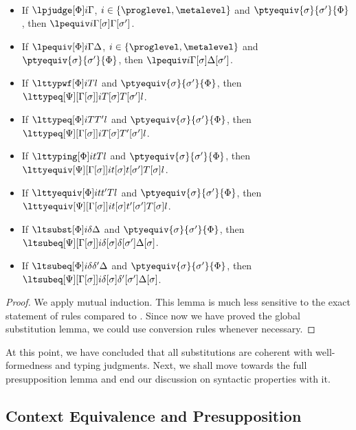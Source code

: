 \begin{lemma}$ $
  \begin{itemize}
  \item If $\lpjudge[\Phi] i \Gamma$, $i \in \{\proglevel, \metalevel\}$ and $\ptyequiv{\sigma}{\sigma'}{\Phi}$, then $\lpequiv i {\Gamma[\sigma]}{\Gamma[\sigma']}$.
  \item If $\lpequiv[\Phi] i \Gamma \Delta$, $i \in \{\proglevel, \metalevel\}$ and $\ptyequiv{\sigma}{\sigma'}{\Phi}$, then $\lpequiv i {\Gamma[\sigma]}{\Delta[\sigma']}$.
  \item If $\lttypwf[\Phi]i T l$ and $\ptyequiv{\sigma}{\sigma'}{\Phi}$, then
    $\lttypeq[\Psi][\Gamma[\sigma]] i{T[\sigma]}{T[\sigma']} l$.
  \item If $\lttypeq[\Phi]i T{T'} l$ and $\ptyequiv{\sigma}{\sigma'}{\Phi}$, then
    $\lttypeq[\Psi][\Gamma[\sigma]] i{T[\sigma]}{T'[\sigma']} l$.
  \item If $\lttyping[\Phi]i t T l$ and $\ptyequiv{\sigma}{\sigma'}{\Phi}$, then
    $\lttyequiv[\Psi][\Gamma[\sigma]] i{t[\sigma]}{t[\sigma']}{T[\sigma]} l$.
  \item If $\lttyequiv[\Phi]i t{t'} T l$ and $\ptyequiv{\sigma}{\sigma'}{\Phi}$, then
    $\lttyequiv[\Psi][\Gamma[\sigma]] i{t[\sigma]}{t'[\sigma']}{T[\sigma]} l$.
  \item If $\ltsubst[\Phi] i{\delta}{\Delta}$ and $\ptyequiv{\sigma}{\sigma'}{\Phi}$, then
    $\ltsubeq[\Psi][\Gamma[\sigma]] i{\delta[\sigma]}{\delta[\sigma']}{\Delta[\sigma]}$.
  \item If $\ltsubeq[\Phi] i{\delta}{\delta'}{\Delta}$ and $\ptyequiv{\sigma}{\sigma'}{\Phi}$, then
    $\ltsubeq[\Psi][\Gamma[\sigma]] i{\delta[\sigma]}{\delta'[\sigma']}{\Delta[\sigma]}$.
  \end{itemize}
\end{lemma}
\begin{proof}
  We apply mutual induction. %
  This lemma is much less sensitive to the exact statement of rules compared to
  . %
  Since now we have proved the global substitution lemma, we could use conversion
  rules whenever necessary.
\end{proof}

At this point, we have concluded that all substitutions are coherent with
well-formedness and typing judgments. %
Next, we shall move towards the full presupposition lemma and end our discussion on
syntactic properties with it.

\subsection{Context Equivalence and Presupposition}

